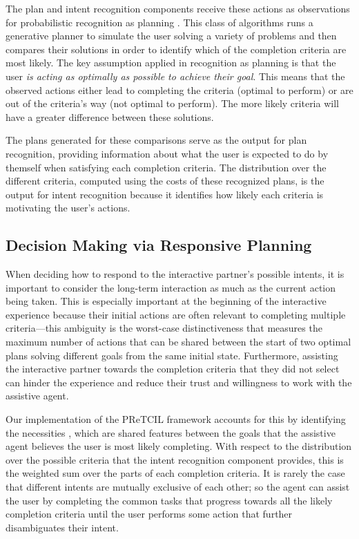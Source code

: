 \documentclass[letterpaper]{article} %
\begin{document}
The plan and intent recognition components receive these actions as observations for probabilistic recognition as planning \cite{DBLP:conf/aaai/RamirezG10}.  This class of algorithms runs a generative planner to simulate the user solving a variety of problems and then compares their solutions in order to identify which of the completion criteria are most likely.  The key assumption applied in recognition as planning is that the user \textit{is acting as optimally as possible to achieve their goal}.  This means that %
the observed actions either lead to completing the criteria (optimal to perform) or are out of the criteria's way (not optimal to perform).  The more likely criteria will have a greater difference between these solutions. %

The plans generated for these comparisons serve as the output for plan recognition, providing information about what the user is expected to do by themself when satisfying each completion criteria.  The distribution over the different criteria, computed using the costs of these recognized plans, is the output for intent recognition because it identifies how likely each criteria is motivating the user's actions.

\subsection{Decision Making via Responsive Planning\label{sec:pretcil.dec_making}}
When deciding how to respond to the interactive partner's possible intents, it is important to consider the long-term interaction as much as the current action being taken.  This is especially important at the beginning of the interactive experience because their initial actions are often relevant to completing multiple criteria---this ambiguity is the worst-case distinctiveness \cite{keren_ICAPS147814} that measures the maximum number of actions that can be shared between the start of two optimal plans solving different goals from the same initial state.
Furthermore, assisting the interactive partner towards the completion criteria that they did not select can hinder the experience and reduce their trust and willingness to work with the assistive agent.

Our implementation of the {\sc PReTCIL} framework accounts for this by identifying the necessities \cite{fz_aaai2017}, which are shared features between the goals that the assistive agent believes the user is most likely completing.  With respect to the distribution over the possible criteria that the intent recognition component provides, this is the weighted sum over the parts of each completion criteria.  It is rarely the case that different intents are mutually exclusive of each other; so the agent can assist the user by completing the common tasks that progress towards all the likely completion criteria until the user performs some action that further disambiguates their intent.
\end{document}
